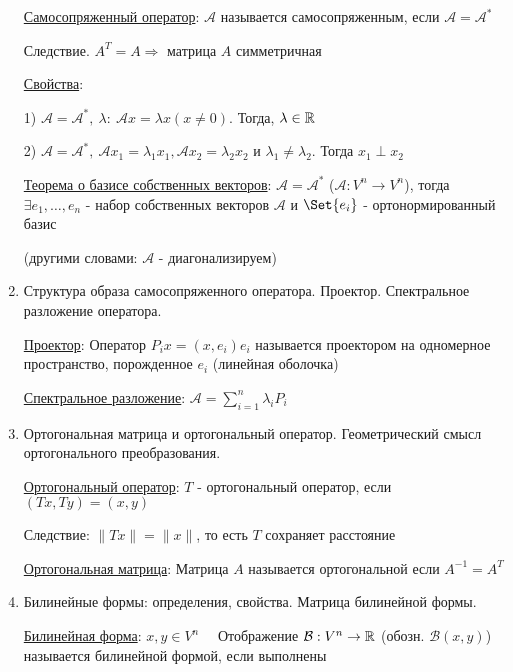 \documentclass[12pt]{article}
\begin{document}
\begin{enumerate}
        \hyperlink{selfconjugateoperator}{Самосопряженный оператор}: $\mathcal{A}$ называется самосопряженным, если $\mathcal{A} = \mathcal{A}^*$

        Следствие. $A^T = A \Longrightarrow$ матрица $A$ симметричная

        \hyperlink{selfconjugateoperatorproperties}{Свойства}:

        1) $\mathcal{A} = \mathcal{A}^*, \ \lambda : \ \mathcal{A}x = \lambda x (x \neq 0)$. Тогда, $\lambda \in \mathbb{R}$

        2) $\mathcal{A} = \mathcal{A}^*, \ \mathcal{A}x_1 = \lambda_1 x_1, \mathcal{A}x_2 = \lambda_2 x_2$ и $\lambda_1 \neq \lambda_2$. Тогда $x_1 \perp x_2$

        \hyperlink{theoremabouteigenvectorsinselfconjugateoperator}{Теорема о базисе собственных векторов}: $\mathcal{A} = \mathcal{A}^*$ ($\mathcal{A} : V^n \to V^n$),
        тогда $\exists e_1, \dots, e_n$ - набор собственных векторов $\mathcal{A}$ и $\Set{e_i}$ - ортонормированный базис

        (другими словами: $\mathcal{A}$ - диагонализируем)

        \item Структура образа самосопряженного оператора. Проектор. Спектральное разложение оператора.

        \hyperlink{projector}{Проектор}: Оператор $P_i x = (x, e_i) e_i$ называется проектором на одномерное пространство, порожденное $e_i$ (линейная оболочка)

        \hyperlink{spectraldecomposition}{Спектральное разложение}: $\mathcal{A} = \sum_{i = 1}^{n} \lambda_i P_i$

        \item Ортогональная матрица и ортогональный оператор. Геометрический смысл ортогонального преобразования.

        \hyperlink{orthogonaloperator}{Ортогональный оператор}: $T$ - ортогональный оператор, если $(Tx, Ty) = (x, y)$

        Следствие: $\|Tx\| = \|x\|$, то есть $T$ сохраняет расстояние

        \hyperlink{orthogonalmatrix}{Ортогональная матрица}: Матрица $A$ называется ортогональной если $A^{-1} = A^T$



        \item Билинейные формы: определения, свойства. Матрица билинейной формы.

        \hyperlink{bilinearforms}{Билинейная форма}: $x, y \in V^n \quad$ Отображение $\mathcal{B}: V^n \to \mathbb{R}$ (обозн. $\mathcal{B}(x, y)$)
        называется билинейной формой, если выполнены


\end{enumerate}
\end{document}
